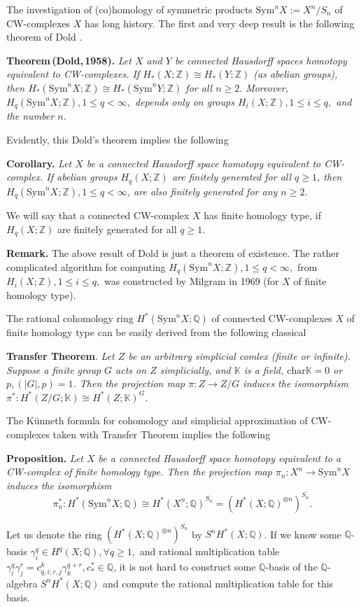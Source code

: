 \documentclass[a4paper,14pt]{article}
\newcommand{\K}{\mathbb{K}}
\newcommand{\Sym}{\mathrm{Sym}}
\newcommand{\Q}{\mathbb{Q}}
\newcommand{\Z}{\mathbb{Z}}
\begin{document}
The investigation of (co)homology of symmetric products $\Sym^n X:=X^n/S_n$ of CW-complexes $X$ has long history. The first and very deep result is the following theorem of Dold \cite{Dold}.

{\bf Theorem\,(Dold,\,1958).} {\it 
Let $X$ and $Y$ be connected Hausdorff spaces homotopy equivalent to CW-complexes. If $H_*(X;\Z)\cong H_*(Y;\Z)$ (as abelian groups), then $H_*(\Sym^n X;\Z)\cong H_*(\Sym^n Y;\Z)$ for all $n\ge 2.$ Moreover, $H_q(\Sym^n X;\Z), 1\le q < \infty,$ depends only on groups $H_i(X;\Z), 1\le i\le q,$ and the number $n$.}

Evidently, this Dold's theorem implies the following

\textbf{Corollary.} {\it Let $X$ be a connected Hausdorff space homotopy equivalent to CW-complex. If abelian groups $H_q(X;\Z)$ are finitely generated for all $q\ge 1$, then $H_q(\Sym^n X;\Z), 1\le q < \infty$, are also finitely generated for any $n\ge 2$.}

We will say that a connected CW-complex $X$ has finite homology type, if $H_q(X;\Z)$ are finitely generated for all $q\ge 1$.

\textbf{Remark.} The above result of Dold is just a theorem of existence. The rather complicated algorithm for computing $H_q(\Sym^n X;\Z), 1\le q< \infty,$ from $H_i(X;\Z), 1\le i\le q,$ was constructed by Milgram \cite{Mil} in 1969 (for $X$ of finite homology type).

The rational cohomology ring $H^*(\Sym^n X;\Q)$ of connected CW-complexes $X$ of finite homology type can be easily derived from the following classical 

\textbf{Transfer Theorem}. {\it Let $Z$ be an arbitrary simplicial comlex (finite or infinite). Suppose a finite group $G$ acts on $Z$ simplicially, and $\K$ is a field, $\mathrm{char}\K=0$ or $p, (|G|,p)=1$. Then the projection map $\pi:Z\to Z/G$ induces the isomorphism $\pi^*:H^*(Z/G;\K)\cong H^*(Z;\K)^G$.}

The K\"unneth formula for cohomology and simplicial approximation of CW-complexes taken with Transfer Theorem implies the following 

\textbf{Proposition.}  {\it Let $X$ be a connected Hausdorff space homotopy equivalent to a CW-complex of finite homology type. Then the projection map $\pi_n:X^n\to\Sym^n X$ induces the isomorphism 
$$
\pi_n^*:H^*(\Sym^n X;\Q)\cong H^*(X^n;\Q)^{S_n} = (H^*(X;\Q)^{\otimes n})^{S_n}.
$$
}


Let us denote the ring $(H^*(X;\Q)^{\otimes n})^{S_n}$ by $S^n H^*(X;\Q)$. If we know some $\Q$-basis $\gamma_{i}^{q} \in H^q(X;\Q), \forall q\ge 1,$ and rational multiplication table $\gamma_{i}^{q}\gamma_{j}^{r} = c_{q,i;r,j}^{k}\gamma_{k}^{q+r}, c^*_{*}\in \Q$, it is not hard to construct some $\Q$-basis of the $\Q$-algebra $S^n H^*(X;\Q)$ and compute the rational multiplication table for this basis. 
\end{document}
